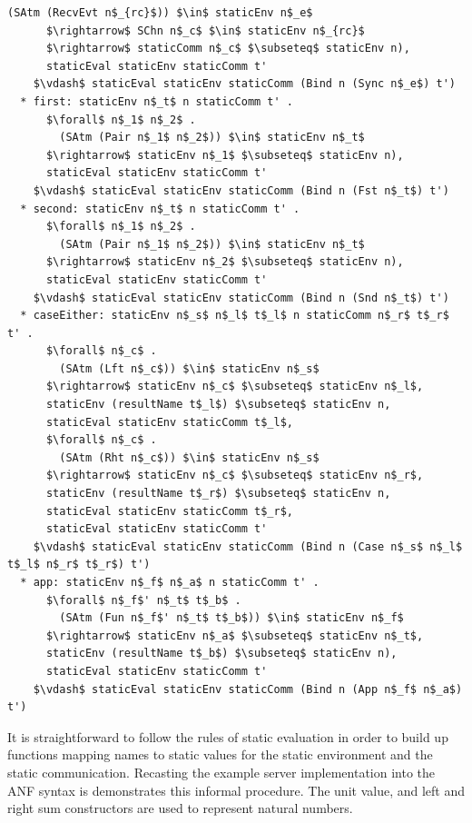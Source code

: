 \documentclass[letterpaper, 11pt]{extarticle}
\begin{document}
\begin{lstlisting}[language=logic, mathescape]
        (SAtm (RecvEvt n$_{rc}$)) $\in$ staticEnv n$_e$
      $\rightarrow$ SChn n$_c$ $\in$ staticEnv n$_{rc}$ 
      $\rightarrow$ staticComm n$_c$ $\subseteq$ staticEnv n),
      staticEval staticEnv staticComm t'
    $\vdash$ staticEval staticEnv staticComm (Bind n (Sync n$_e$) t')
  * first: staticEnv n$_t$ n staticComm t' . 
      $\forall$ n$_1$ n$_2$ .
        (SAtm (Pair n$_1$ n$_2$)) $\in$ staticEnv n$_t$
      $\rightarrow$ staticEnv n$_1$ $\subseteq$ staticEnv n),
      staticEval staticEnv staticComm t'
    $\vdash$ staticEval staticEnv staticComm (Bind n (Fst n$_t$) t')
  * second: staticEnv n$_t$ n staticComm t' . 
      $\forall$ n$_1$ n$_2$ . 
        (SAtm (Pair n$_1$ n$_2$)) $\in$ staticEnv n$_t$
      $\rightarrow$ staticEnv n$_2$ $\subseteq$ staticEnv n),
      staticEval staticEnv staticComm t'
    $\vdash$ staticEval staticEnv staticComm (Bind n (Snd n$_t$) t')
  * caseEither: staticEnv n$_s$ n$_l$ t$_l$ n staticComm n$_r$ t$_r$ t' . 
      $\forall$ n$_c$ .  
        (SAtm (Lft n$_c$)) $\in$ staticEnv n$_s$
      $\rightarrow$ staticEnv n$_c$ $\subseteq$ staticEnv n$_l$,
      staticEnv (resultName t$_l$) $\subseteq$ staticEnv n,
      staticEval staticEnv staticComm t$_l$,
      $\forall$ n$_c$ . 
        (SAtm (Rht n$_c$)) $\in$ staticEnv n$_s$
      $\rightarrow$ staticEnv n$_c$ $\subseteq$ staticEnv n$_r$, 
      staticEnv (resultName t$_r$) $\subseteq$ staticEnv n, 
      staticEval staticEnv staticComm t$_r$,
      staticEval staticEnv staticComm t'
    $\vdash$ staticEval staticEnv staticComm (Bind n (Case n$_s$ n$_l$ t$_l$ n$_r$ t$_r$) t')
  * app: staticEnv n$_f$ n$_a$ n staticComm t' . 
      $\forall$ n$_f$' n$_t$ t$_b$ . 
        (SAtm (Fun n$_f$' n$_t$ t$_b$)) $\in$ staticEnv n$_f$
      $\rightarrow$ staticEnv n$_a$ $\subseteq$ staticEnv n$_t$, 
      staticEnv (resultName t$_b$) $\subseteq$ staticEnv n),
      staticEval staticEnv staticComm t'
    $\vdash$ staticEval staticEnv staticComm (Bind n (App n$_f$ n$_a$) t')
\end{lstlisting}

It is straightforward to follow the rules of static evaluation in order to build up
functions mapping names to static values for the static environment
and the static communication.
Recasting the example server implementation into the ANF syntax is demonstrates this informal procedure.
The unit value, and left and right sum constructors are used to represent natural numbers.
\end{document}
